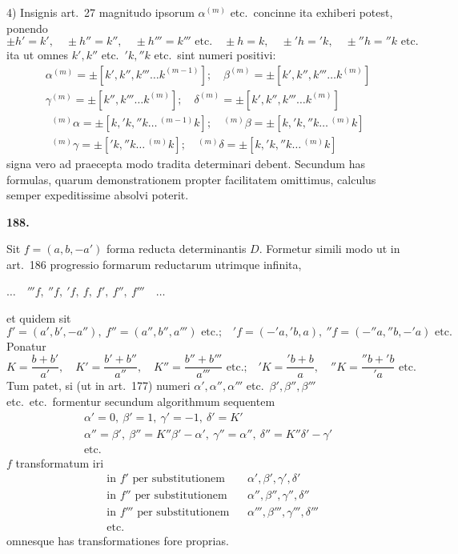 \documentclass[12pt,a4paper]{article}
\theoremstyle{plain}
\theoremstyle{definition}
\theoremstyle{remark}
\begin{document}
4) Insignis art.\ 27 magnitudo ipsorum $\alpha^{(m)}$ etc.\ concinne ita exhiberi potest, ponendo
\[\pm h'=k',\quad \pm h''=k'',\quad \pm h'''=k'''\text{ etc.}\quad \pm h=k,\quad \pm 'h='k,\quad \pm ''h=''k\text{ etc.}\]
ita ut omnes $k',k''$ etc.\ $'k,''k$ etc.\ sint numeri positivi:
\begin{gather*}
\alpha^{(m)}=\pm[k',k'',k'''\ldots k^{(m-1)}];\quad \beta^{(m)}=\pm[k',k'',k'''\ldots k^{(m)}]\\
\gamma^{(m)}=\pm[k'',k'''\ldots k^{(m)}];\quad \delta^{(m)}=\pm[k',k'',k'''\ldots k^{(m)}]
\end{gather*}
\begin{gather*}
^{(m)}\alpha=\pm[k,'k,''k\ldots\,^{(m-1)}k];\quad ^{(m)}\beta=\pm[k,'k,''k\ldots\,^{(m)}k]\\
^{(m)}\gamma=\pm['k,''k\ldots\,^{(m)}k];\quad ^{(m)}\delta=\pm[k,'k,''k\ldots\,^{(m)}k]
\end{gather*}
signa vero ad praecepta modo tradita determinari debent. Secundum has formulas, quarum demonstrationem propter facilitatem omittimus, calculus semper expeditissime absolvi poterit.

\textbf{188.}

Sit $f=(a,b,-a')$ forma reducta determinantis $D$. Formetur simili modo ut in art.\ 186 progressio formarum reductarum utrimque infinita,

$\ldots\quad'''f,\ ''f,\ 'f,\ f,\ f',\ f'',\ f'''\quad\ldots$

et quidem sit
\[f'=(a',b',-a''),\ f''=(a'',b'',a''')\text{ etc.;}\quad 'f=(-'a,'b,a),\ ''f=(-''a,''b,-'a)\text{ etc.}\]
Ponatur
\[K=\frac{b+b'}{a'},\quad K'=\frac{b'+b''}{a''},\quad K''=\frac{b''+b'''}{a'''}\text{ etc.;}\quad 'K=\frac{'b+b}{a},\quad ''K=\frac{''b+'b}{'a}\text{ etc.}\]
Tum patet, si (ut in art.\ 177) numeri $\alpha',\alpha'',\alpha'''$ etc.\ $\beta',\beta'',\beta'''$ etc.\ etc.\ formentur secundum algorithmum sequentem
\begin{gather*}
\alpha'=0,\ \beta'=1,\ \gamma'=-1,\ \delta'=K'\\
\alpha''=\beta',\ \beta''=K''\beta'-\alpha',\ \gamma''=\alpha'',\ \delta''=K''\delta'-\gamma'\\
\text{etc.}
\end{gather*}
$f$ transformatum iri
\begin{align*}
&\text{in }f'\text{ per substitutionem}&&\alpha',\beta',\gamma',\delta'\\
&\text{in }f''\text{ per substitutionem}&&\alpha'',\beta'',\gamma'',\delta''\\
&\text{in }f'''\text{ per substitutionem}&&\alpha''',\beta''',\gamma''',\delta'''\\
&\text{etc.}\end{align*}
omnesque has transformationes fore proprias.
\end{document}
